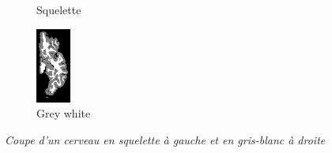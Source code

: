 \documentclass[12pt, oneside, a4paper, titlepage]{article}
\begin{document}
\begin{figure}[H]
\begin{subfigure}{.2\textwidth}
  \caption{Squelette}
  \label{fig:sub1}
\end{subfigure}%
\begin{subfigure}{.2\textwidth}
  \includegraphics[width=\textwidth]{X2_3330.png}
  \caption{Grey white}
  \label{fig:sub2}
\end{subfigure}
\caption{\textit{Coupe d'un cerveau en squelette à gauche et en gris-blanc à droite}}
\label{fig:proj1}
\end{figure}
\end{document}
